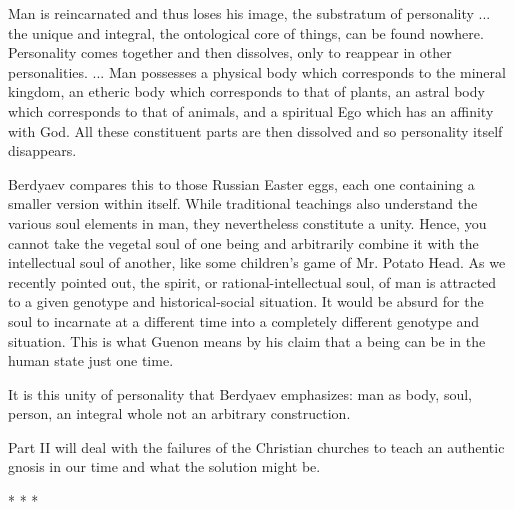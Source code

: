 \begin{quotex}
Man is reincarnated and thus loses his image, the substratum of personality ... the unique and integral, the ontological core of things, can be found nowhere. Personality comes together and then dissolves, only to reappear in other personalities. ... Man possesses a physical body which corresponds to the mineral kingdom, an etheric body which corresponds to that of plants, an astral body which corresponds to that of animals, and a spiritual Ego which has an affinity with God. All these constituent parts are then dissolved and so personality itself disappears.
\end{quotex}


Berdyaev compares this to those Russian Easter eggs, each one containing a smaller version within itself. While traditional teachings also understand the various soul elements in man, they nevertheless constitute a unity. Hence, you cannot take the vegetal soul of one being and arbitrarily combine it with the intellectual soul of another, like some children's game of Mr. Potato Head. As we recently pointed out, the spirit, or rational-intellectual soul, of man is attracted to a given genotype and historical-social situation. It would be absurd for the soul to incarnate at a different time into a completely different genotype and situation. This is what Guenon means by his claim that a being can be in the human state just one time.

It is this unity of personality that Berdyaev emphasizes: man as body, soul, person, an integral whole not an arbitrary construction.

Part II will deal with the failures of the Christian churches to teach an authentic gnosis in our time and what the solution might be.



\begin{center}* * *\end{center}

